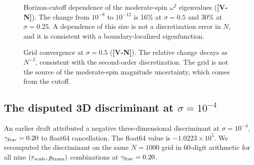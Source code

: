 \documentclass[11pt, a4paper]{article}
\newcommand{\VN}{\textcolor{vn}{\textbf{[V-N]}}}
\theoremstyle{remark}
\theoremstyle{definition}
\begin{document}
\begin{figure}[H]
\centering
{}
\caption{Horizon-cutoff dependence of the moderate-spin $\omega^2$ eigenvalues (\VN). The change from $10^{-8}$ to $10^{-12}$ is 16\% at $\sigma=0.5$ and 30\% at $\sigma=0.25$. A dependence of this size is not a discretization error in $N$, and it is consistent with a boundary-localized eigenfunction.}
\label{fig:cutoff}
\end{figure}

\begin{figure}[H]
\centering
{}
\caption{Grid convergence at $\sigma=0.5$ (\VN). The relative change decays as $N^{-2}$, consistent with the second-order discretization. The grid is not the source of the moderate-spin magnitude uncertainty, which comes from the cutoff.}
\label{fig:conv}
\end{figure}

\subsection{The disputed 3D discriminant at $\sigma = 10^{-4}$}

An earlier draft attributed a negative three-dimensional discriminant at $\sigma = 10^{-4}$, $\gamma_{\rm frac} = 0.20$ to float64 cancellation. The float64 value is $-1.0223\times10^5$. We recomputed the discriminant on the same $N=1000$ grid in 60-digit arithmetic for all nine $(r_{\rm scale}, p_{\rm trans})$ combinations at $\gamma_{\rm frac}=0.20$.
\end{document}
